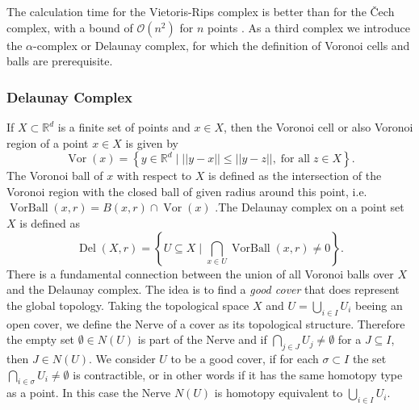 \documentclass[runningheads]{llncs}
\DeclareMathOperator{\VorBall}{\text{VorBall}}
\DeclareMathOperator{\Vor}{\text{Vor}}
\DeclareMathOperator{\Del}{\text{Del}}
\begin{document}
The calculation time for the Vietoris-Rips complex is better than for the \v{C}ech complex, with a bound of $\mathcal{O}(n^2)$ for $n$ points \cite{Zomorodian10}. As a third complex we introduce the $\alpha$-complex or Delaunay complex, for which the definition of Voronoi cells and balls are prerequisite.


\subsubsection{Delaunay Complex} If $X \subset \mathbb{R}^d$ is a finite set of points and $x \in X$, then the Voronoi cell or also Voronoi region of a point $x \in X$ is given by
\begin{equation}
\label{voronoicell}
\Vor(x) = \left\{ y \in \mathbb{R}^d \; \bigg\vert \; ||y-x|| \leq ||y-z||, \; \text{for all} \; z \in X \right\}.
\end{equation}
The Voronoi ball of $x$ with respect to $X$ is defined as the intersection of the Voronoi region with the closed ball of given radius around this point, i.e.   $\VorBall(x,r) = B(x,r) \cap \Vor(x)$ \cite{bauer2017morse}.The Delaunay complex on a point set $X$ is defined as
\begin{equation}
\label{delaunay}
	\Del(X,r) = \left\{ U \subseteq X \; \bigg\rvert \; \bigcap_{x\in U} \VorBall(x,r) \neq 0 \right\}.
\end{equation}
There is a fundamental connection between the union of all Voronoi balls over $X$ and the Delaunay complex. The idea is to find a \textit{good cover} that does represent the global topology. Taking the topological space $X$ and $U = \bigcup_{i \in I} U_i$ beeing an open cover, we define the Nerve of a cover as its topological structure. Therefore the empty set $\emptyset \in N(U)$ is part of the Nerve and if $\bigcap_{j\in J} U_j \neq \emptyset$ for a $J \subseteq I$, then $J \in N(U)$. We consider $U$ to be a good cover, if for each $\sigma \subset I$ the set $\bigcap_{i\in \sigma} U_i \neq \emptyset$ is contractible, or in other words if it has the same homotopy type as a point. In this case the Nerve $N(U)$ is homotopy equivalent to $\bigcup_{i \in I} U_i$.
\end{document}
